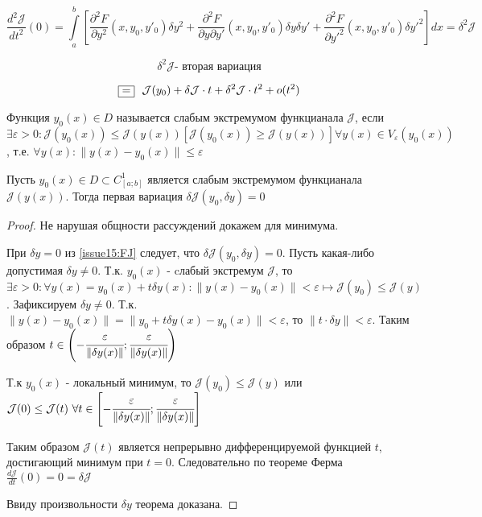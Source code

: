 \begin{equation} \label{issue15:SJ}
    \frac{d^2 \mathcal{J}}{dt^2}(0) = \int \limits_a^b \left[  \frac{\partial^2 F}{\partial y^2}(x, y_0, y'_0) \delta y^2 
    + \frac{\partial^2 F}{\partial y \partial {y'}} (x, y_0, y'_0) \delta y \delta {y'} + \frac{\partial^2 F}{\partial {y'}^2} (x, y_0, y'_0) \delta {y'}^2  \right] dx 
    = \delta^2 \mathcal{J}
\end{equation}

\[ \delta^2 \mathcal{J} \text{- вторая вариация} \]

\[ \fbox{=}~~ \mathcal{J}(y_0) + \delta \mathcal{J}\cdot t + \delta^2 \mathcal{J} \cdot t^2 + o(t^2)\]

\begin{definition}
    Функция $y_0(x) \in D$ называется слабым экстремумом функцианала $\mathcal{J}$, если $\exists \varepsilon > 0: \mathcal{J}(y_0(x)) \leq \mathcal{J}(y(x)) \left[ \mathcal{J}(y_0(x)) \geq \mathcal{J}(y(x)) \right] \forall y(x) \in V_{\varepsilon} (y_0(x))$, т.е. $\forall y(x): \| y(x) - y_0(x)\| \leq \varepsilon$ 
\end{definition}

\begin{theorem}
    Пусть $y_0(x) \in D \subset C^1_{[a;b]}$ является слабым экстремумом функцианала $\mathcal{J}(y(x))$. Тогда первая вариация $\delta \mathcal{J}(y_0, \delta y) = 0$ 
\end{theorem}
\begin{proof}
    Не нарушая общности рассуждений докажем для минимума.
    
    При $\delta y = 0$ из \eqref{issue15:FJ} следует, что $\delta \mathcal{J}(y_0, \delta y) = 0$. Пусть какая-либо допустимая $\delta y \neq 0$. Т.к. $y_0(x)$ - cлабый экстремум $\mathcal{J}$, то $\exists \varepsilon > 0: \forall y(x) = y_0(x) + t \delta y(x): \| y(x) - y_0(x) \| < \varepsilon \mapsto \mathcal{J}(y_0) \leq \mathcal{J}(y)$. 
    Зафиксируем $\delta y \neq 0$. Т.к. $\| y(x) - y_0(x) \| = \| y_0 + t \delta y(x) - y_0(x)\| < \varepsilon$, то $\| t \cdot \delta y \| < \varepsilon $. Таким образом $t \in \left( - \cfrac{\varepsilon}{\| \delta y(x)\|}; \cfrac{\varepsilon}{\| \delta y(x)\|}\right)$  

    Т.к $y_0(x)$ - локальный минимум, то $\mathcal{J}(y_0) \leq \mathcal{J}(y)$ или $\mathcal{J}(0) \leq \mathcal{J}(t)~\forall t \in \left[ - \cfrac{\varepsilon}{\| \delta y(x)\|}; \cfrac{\varepsilon}{\| \delta y(x)\|} \right]$ 

    Таким образом $\mathcal{J}(t)$ является непрерывно дифференцируемой функцией $t$, достигающий минимум при $t = 0$. Следовательно по теореме Ферма $\frac{d \mathcal{J}}{dt} (0) = 0 = \delta \mathcal{J}$
    
    Ввиду произвольности $\delta y$ теорема доказана. 
\end{proof}

